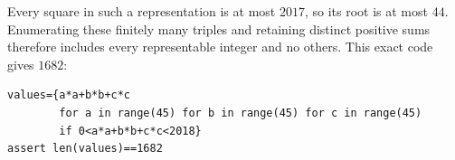 Every square in such a representation is at most $2017$, so its root is at most $44$. Enumerating these finitely many triples and retaining distinct positive sums therefore includes every representable integer and no others. This exact code gives $\boxed{1682}$:
\begin{verbatim}
values={a*a+b*b+c*c
        for a in range(45) for b in range(45) for c in range(45)
        if 0<a*a+b*b+c*c<2018}
assert len(values)==1682
\end{verbatim}
